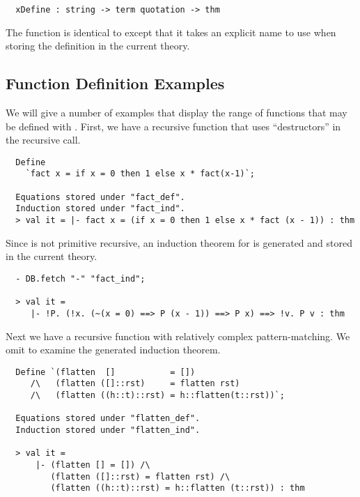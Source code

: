 \begin{hol}
\begin{verbatim}
  xDefine : string -> term quotation -> thm
\end{verbatim}
\end{hol}
The  function is identical to
 except that it takes an explicit name to use when
storing the definition in the current theory.

\subsection{Function Definition Examples}
 We will give a number of examples that display the range of functions
that may be defined with . First, we have a recursive function
that uses ``destructors'' in the recursive call.

\begin{hol}
\begin{verbatim}
  Define
    `fact x = if x = 0 then 1 else x * fact(x-1)`;

  Equations stored under "fact_def".
  Induction stored under "fact_ind".
  > val it = |- fact x = (if x = 0 then 1 else x * fact (x - 1)) : thm
\end{verbatim}
\end{hol}
%
Since  is not
primitive recursive, an induction theorem for  is generated and
stored in the current theory.
%
\begin{hol}
\begin{verbatim}
  - DB.fetch "-" "fact_ind";

  > val it =
     |- !P. (!x. (~(x = 0) ==> P (x - 1)) ==> P x) ==> !v. P v : thm
\end{verbatim}
\end{hol}

Next we have a recursive function with relatively complex
pattern-matching. We omit to examine the generated induction
theorem.
%
\begin{hol}
\begin{verbatim}
  Define `(flatten  []           = [])
     /\   (flatten ([]::rst)     = flatten rst)
     /\   (flatten ((h::t)::rst) = h::flatten(t::rst))`;

  Equations stored under "flatten_def".
  Induction stored under "flatten_ind".

  > val it =
      |- (flatten [] = []) /\
         (flatten ([]::rst) = flatten rst) /\
         (flatten ((h::t)::rst) = h::flatten (t::rst)) : thm
\end{verbatim}
\end{hol}

